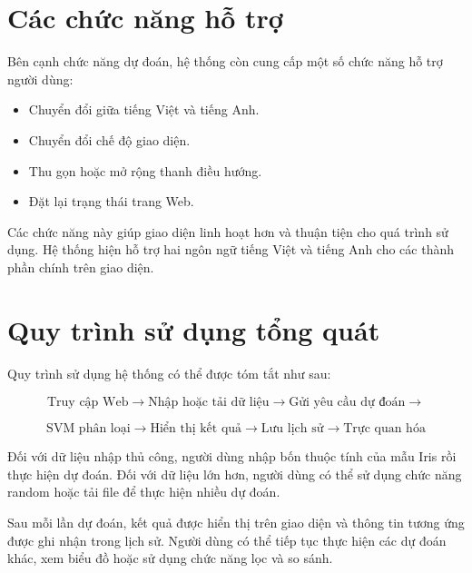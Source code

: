 \documentclass[12pt,a4paper]{report}
\begin{document}
	\section{Các chức năng hỗ trợ}
	
	Bên cạnh chức năng dự đoán, hệ thống còn cung cấp một số chức năng hỗ trợ người dùng:
	
	\begin{itemize}
		\item Chuyển đổi giữa tiếng Việt và tiếng Anh.
		\item Chuyển đổi chế độ giao diện.
		\item Thu gọn hoặc mở rộng thanh điều hướng.
		\item Đặt lại trạng thái trang Web.
	\end{itemize}
	
	Các chức năng này giúp giao diện linh hoạt hơn và thuận tiện cho quá trình sử dụng. Hệ thống hiện hỗ trợ hai ngôn ngữ tiếng Việt và tiếng Anh cho các thành phần chính trên giao diện. 
	\section{Quy trình sử dụng tổng quát}
	
	Quy trình sử dụng hệ thống có thể được tóm tắt như sau:
	
	\[
	\text{Truy cập Web}
	\rightarrow
	\text{Nhập hoặc tải dữ liệu}
	\rightarrow
	\text{Gửi yêu cầu dự đoán}
	\rightarrow
	\]
	
	\[
	\text{SVM phân loại}
	\rightarrow
	\text{Hiển thị kết quả}
	\rightarrow
	\text{Lưu lịch sử}
	\rightarrow
	\text{Trực quan hóa}
	\]
	
	Đối với dữ liệu nhập thủ công, người dùng nhập bốn thuộc tính của mẫu Iris rồi thực hiện dự đoán. Đối với dữ liệu lớn hơn, người dùng có thể sử dụng chức năng random hoặc tải file để thực hiện nhiều dự đoán.
	
	Sau mỗi lần dự đoán, kết quả được hiển thị trên giao diện và thông tin tương ứng được ghi nhận trong lịch sử. Người dùng có thể tiếp tục thực hiện các dự đoán khác, xem biểu đồ hoặc sử dụng chức năng lọc và so sánh.
	
	
	
	
	\newpage
	\renewcommand{\bibname}{\centering \Large \textbf{TÀI LIỆU THAM KHẢO}}
	
	
	
	
	
	
\end{document}
